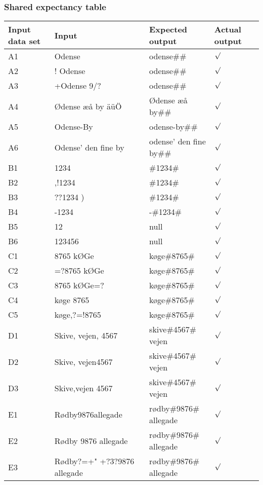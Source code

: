 \documentclass[a4paper,11pt]{article}
\begin{document}
\subsubsection{Shared expectancy table}
\begin{tabular}{ p{1cm} | p{5cm} | p{5cm} | p{1cm} }
	Input data set & Input & Expected output & Actual output \\
	\hline
	A1 & Odense & odense\#\# & $\surd$ \\
	A2 & ! Odense & odense\#\# & $\surd$ \\
	A3 & +Odense 9/? & odense\#\# & $\surd$ \\
	A4 & \O dense \ae \aa \hspace{2pt} by \"{a}\"{u}\"{O} & \O dense \ae \aa \hspace{2pt} by\#\# & $\surd$ \\
	A5 & Odense-By & odense-by\#\# & $\surd$ \\
	A6 & Odense' den fine by & odense' den fine by\#\# & $\surd$ \\
	B1 & 1234 & $\#$1234$\#$ & $\surd$ \\
	B2 & ,!1234 & $\#$1234$\#$ & $\surd$ \\
	B3 & ??1234  ) & $\#$1234$\#$ & $\surd$ \\
	B4 & -1234 & -$\#$1234$\#$ & $\surd$ \\
	B5 & 12 & null & $\surd$ \\
	B6 & 123456 & null & $\surd$ \\
	C1 & 8765 k\O Ge & k\o ge$\#$8765$\#$ & $\surd$ \\
	C2 & =?8765 k\O Ge & k\o ge$\#$8765$\#$ & $\surd$ \\
	C3 & 8765 k\O Ge=? & k\o ge$\#$8765$\#$ & $\surd$ \\
	C4 & k\o ge 8765 & k\o ge$\#$8765$\#$ & $\surd$ \\
	C5 & k\o ge,?=!8765 & k\o ge$\#$8765$\#$ & $\surd$ \\
	D1 & Skive, vejen, 4567 & skive$\#$4567$\#$vejen & $\surd$ \\
	D2 & Skive, vejen4567 & skive$\#$4567$\#$vejen & $\surd$ \\
	D3 & Skive,vejen 4567 & skive$\#$4567$\#$vejen & $\surd$ \\
	E1 & R\o dby9876allegade & r\o dby$\#$9876$\#$allegade & $\surd$ \\
	E2 & R\o dby 9876 allegade & r\o dby$\#$9876$\#$allegade & $\surd$ \\
	E3 & R\o dby?=+" +?3?9876 allegade & r\o dby$\#$9876$\#$allegade & $\surd$ \\

\end{tabular}
\end{document}
